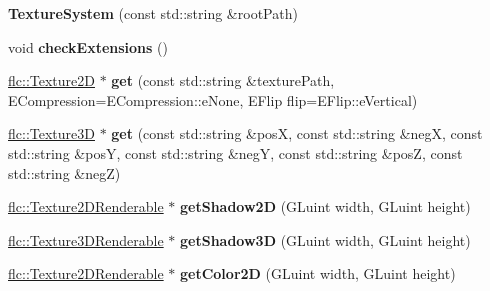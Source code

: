 \begin{DoxyCompactItemize}
\item 
\mbox{\label{classflw_1_1flf_1_1TextureSystem_aae79fbc26053626671070f7d0b607f30}} 
{\bfseries Texture\+System} (const std\+::string \&root\+Path)
\item 
\mbox{\label{classflw_1_1flf_1_1TextureSystem_adcb16801269c352a0ef7fecdf402002e}} 
void {\bfseries check\+Extensions} ()
\item 
\mbox{\label{classflw_1_1flf_1_1TextureSystem_a161aa87d322637c486702ca470a22228}} 
\hyperlink{classflw_1_1flc_1_1Texture2D}{flc\+::\+Texture2D} $\ast$ {\bfseries get} (const std\+::string \&texture\+Path, E\+Compression=E\+Compression\+::e\+None, E\+Flip flip=E\+Flip\+::e\+Vertical)
\item 
\mbox{\label{classflw_1_1flf_1_1TextureSystem_a8fadccb0768c9b393b969f80f56e0bce}} 
\hyperlink{classflw_1_1flc_1_1Texture3D}{flc\+::\+Texture3D} $\ast$ {\bfseries get} (const std\+::string \&posX, const std\+::string \&negX, const std\+::string \&posY, const std\+::string \&negY, const std\+::string \&posZ, const std\+::string \&negZ)
\item 
\mbox{\label{classflw_1_1flf_1_1TextureSystem_a3c008aa31793c20817073cfa1f9ade44}} 
\hyperlink{classflw_1_1flc_1_1Texture2DRenderable}{flc\+::\+Texture2\+D\+Renderable} $\ast$ {\bfseries get\+Shadow2D} (G\+Luint width, G\+Luint height)
\item 
\mbox{\label{classflw_1_1flf_1_1TextureSystem_a798cdc57fe106f0497146375f27eda3a}} 
\hyperlink{classflw_1_1flc_1_1Texture3DRenderable}{flc\+::\+Texture3\+D\+Renderable} $\ast$ {\bfseries get\+Shadow3D} (G\+Luint width, G\+Luint height)
\item 
\mbox{\label{classflw_1_1flf_1_1TextureSystem_a8aca62daea83c17c017aa4416570d8d9}} 
\hyperlink{classflw_1_1flc_1_1Texture2DRenderable}{flc\+::\+Texture2\+D\+Renderable} $\ast$ {\bfseries get\+Color2D} (G\+Luint width, G\+Luint height)
\item 
\mbox{\label{classflw_1_1flf_1_1TextureSystem_a36bc7a5329d3fefbde138edf7f7f755e}} 

\end{DoxyCompactItemize}
